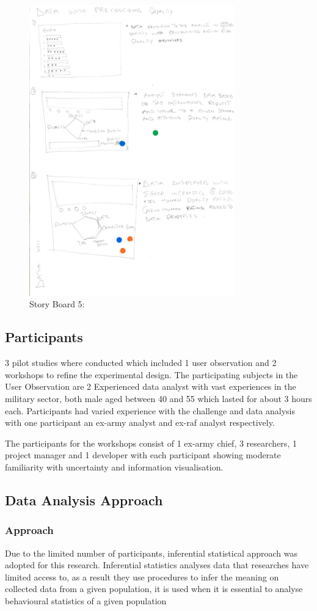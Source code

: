 \documentclass[journal]{vgtc}                %
\begin{document}
\begin{figure}[htb]
 \centering
 \includegraphics[width=3.5in]{img/saminu}
 \caption{ Story Board 5: }
\end{figure}

\subsection{Participants}
3 pilot studies where conducted which included 1 user observation and 2 workshops to refine the experimental design. The participating subjects in the User Observation are 2 Experienced data analyst with vast experiences in the military sector, both male aged between 40 and 55 which lasted for about 3 hours each. Participants had varied experience with the challenge and data analysis with one participant an ex-army analyst and ex-raf analyst respectively.

The participants for the workshops consist of 1 ex-army chief, 3 researchers, 1 project manager and 1 developer with each participant showing moderate familiarity with uncertainty and information visualisation.

\subsection{Data Analysis Approach}
\subsubsection{Approach}
Due to the limited number of participants, inferential statistical approach was adopted for this research. Inferential statistics analyses data that researches have limited access to, as a result they use procedures to infer the meaning on collected data from a given population, it is used when it is essential to analyse behavioural statistics of a given population
\end{document}
